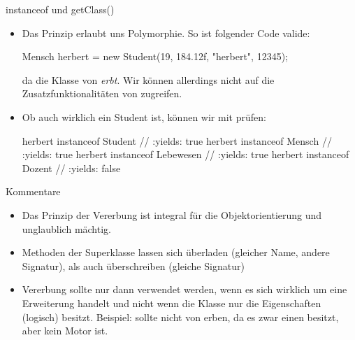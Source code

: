 \begin{frame}[fragile]{instanceof und getClass()}
    \begin{itemize}[<+(1)->]
        \item Das Prinzip erlaubt uns Polymorphie.\pause{} So ist folgender Code valide:\pause{}
\begin{plainjava}
Mensch herbert = new Student(19, 184.12f, "herbert", 12345);
\end{plainjava}
        \pause{}da die Klasse  von  \emph{erbt}.\pause{} Wir können allerdings nicht auf die Zusatzfunktionalitäten von  zugreifen.
        \item Ob  auch wirklich ein Student ist,\pause{} können wir mit  prüfen:\pause{}
\begin{plainjava}
herbert instanceof Student // :yields: true
herbert instanceof Mensch // :yields: true
herbert instanceof Lebewesen // :yields: true
herbert instanceof Dozent // :yields: false
\end{plainjava}
    \end{itemize}
\end{frame}


\begin{frame}{Kommentare}
    \begin{itemize}[<+(1)->]
        \widei
        \item Das Prinzip der Vererbung ist integral für die Objektorientierung und unglaublich mächtig.
        \item Methoden der Superklasse lassen sich überladen (gleicher Name, andere Signatur),\pause{} als auch überschreiben (gleiche Signatur)
        \item Vererbung sollte nur dann verwendet werden,\pause{} wenn es sich wirklich um eine Erweiterung handelt und nicht wenn die Klasse nur die Eigenschaften (logisch) besitzt.\pause{} Beispiel:  sollte nicht von  erben, da es zwar einen besitzt, aber kein Motor ist.
    \end{itemize}
\end{frame}


